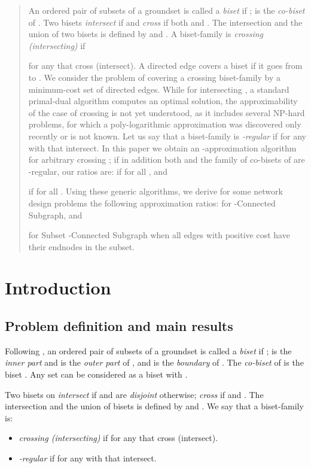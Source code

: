 \begin{abstract}
An ordered pair  of subsets of a groundset  is called a {\em biset} if ;
 is the {\em co-biset} of .
Two bisets  
{\em intersect} if  and 
{\em cross} if both  and .
The intersection and the union of two bisets  is defined by
 and .
A biset-family  is {\em crossing (intersecting)} if 
 
for any  that cross (intersect). 
A directed edge covers a biset  if  it goes from  to .
We consider the problem of covering a crossing biset-family  by a minimum-cost set of directed edges.
While for intersecting , a standard primal-dual algorithm computes an optimal solution,
the approximability of the case of crossing  is not
yet understood, as it includes several NP-hard problems, for which a poly-logarithmic approximation
was discovered only recently or is not known.
Let us say that a biset-family  is {\em -regular} if 
 for any  
with  that intersect.
In this paper we obtain an -approximation algorithm for arbitrary crossing ;
if in addition both  and the family of co-bisets of  are -regular, 
our ratios are:
 if  for all ,
and 
 
if  for all .
Using these generic algorithms, we derive for some network design problems 
the following approximation ratios:
 for {\sf -Connected Subgraph},  and 
 
for {\sf Subset -Connected Subgraph} when all edges with positive cost have their endnodes in the subset.  
\end{abstract}

\section{Introduction}

\subsection{Problem definition and main results}

Following \cite{F-R}, an ordered pair  of subsets of a groundset  is called a {\em biset} 
if ;  is the {\em inner part} and  is the {\em outer part} of ,
and  is the {\em boundary} of . 
The {\em co-biset} of  is the biset .
Any set  can be considered as a biset  with . 

\begin{definition} \label{d:1}
Two bisets  on  
{\em intersect} if  and are {\em disjoint} otherwise;
 {\em cross} if  and .
The intersection and the union of bisets  is defined by
 and .
We say that a biset-family  is: 
\begin{itemize}
\item
{\em crossing (intersecting)} if  
for any  that cross (intersect).
\item
{\em -regular} if  
for any  with  that intersect.
\end{itemize}
\end{definition}

